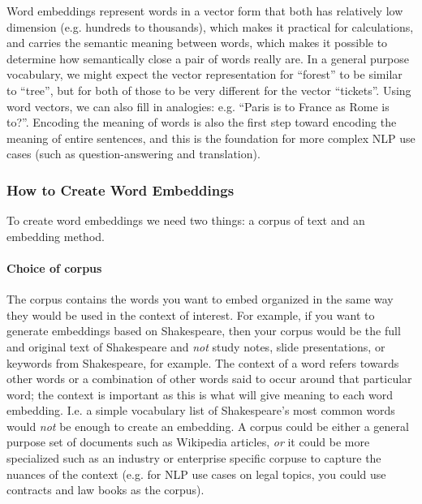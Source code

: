 \documentclass[12pt]{article}
\begin{document}
Word embeddings represent words in a vector form that both has relatively low dimension (e.g. hundreds to thousands), which makes it practical for calculations, and carries the semantic meaning between words, which makes it possible to determine how semantically close a pair of words really are. In a general purpose vocabulary, we might expect the vector representation for ``forest'' to be similar to ``tree'', but for both of those to be very different for the vector ``tickets''. Using word vectors, we can also fill in analogies: e.g. ``Paris is to France as Rome is to?''. Encoding the meaning of words is also the first step toward encoding the meaning of entire sentences, and this is the foundation for more complex NLP use cases (such as question-answering and translation).

\subsubsection{How to Create Word Embeddings} To create word embeddings we need two things: a corpus of text and an embedding method.

\paragraph{Choice of corpus}
The corpus contains the words you want to embed organized in the same way they would be used in the context of interest. For example, if you want to generate embeddings based on Shakespeare, then your corpus would be the full and original text of Shakespeare
and \emph{not} study notes, slide presentations, or keywords from Shakespeare, for example. The context of a word refers towards other words or a combination of other words said to occur around that particular word; the context is important as this is what will give meaning to  each word embedding. I.e. a simple vocabulary list of Shakespeare's most common words would \emph{not} be enough to create an embedding. A corpus could be either a general purpose set of documents such as Wikipedia articles, \emph{or} it could be more specialized such as an industry or enterprise specific corpuse to capture the nuances of the context (e.g. for NLP use cases on legal topics, you could use contracts and law books as the corpus).
\end{document}
